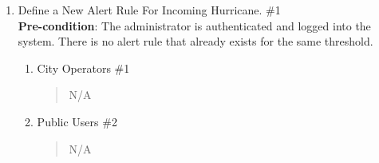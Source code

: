 \documentclass[]{article}
\begin{document}

\begin{enumerate}[{\bf BE1.}]
	\item Define a New Alert Rule For Incoming Hurricane. \#1 \\         
    \textbf{Pre-condition}: The administrator is authenticated and logged into the system. There is no alert rule that already exists for the same threshold.
    
		\begin{enumerate}[{\bf VP1.}]
			\item City Operators \#1 
                \begin{quote}
                    N/A
                \end{quote}
                
			\item Public Users \#2 
				\begin{quote}
				    N/A
				\end{quote}
                

\end{enumerate}
\end{enumerate}
\end{document}

